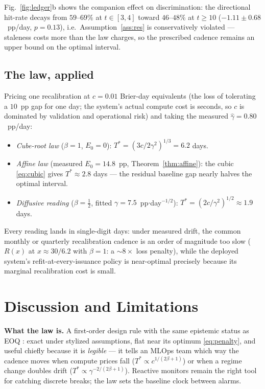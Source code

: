 \documentclass[conference]{IEEEtran}
\begin{document}
Fig.~\ref{fig:ledger}b shows the companion effect on discrimination: the
directional hit-rate decays from $59$--$69\%$ at $t\in[3,4]$ toward
$46$--$48\%$ at $t\ge10$ ($-1.11\pm0.68$~pp/day, $p{=}0.13$), i.e.\
Assumption~\ref{ass:res} is conservatively violated --- staleness costs more
than the law charges, so the prescribed cadence remains an upper bound on
the optimal interval.

\subsection{The law, applied}

Pricing one recalibration at $c=0.01$ Brier-day equivalents (the loss of
tolerating a $10$~pp gap for one day; the system's actual compute cost is
seconds, so $c$ is dominated by validation and operational risk) and taking
the measured $\hat\gamma=0.80$~pp/day:
\begin{itemize}
\item \emph{Cube-root law} ($\beta{=}1$, $E_0{=}0$):
$T^{*}=(3c/2\gamma^2)^{1/3}=6.2$ days.
\item \emph{Affine law} (measured $E_0=14.8$~pp, Theorem~\ref{thm:affine}):
the cubic \eqref{eq:cubic} gives $T^{*}\approx2.8$ days --- the residual
baseline gap nearly halves the optimal interval.
\item \emph{Diffusive reading} ($\beta{=}\tfrac12$, fitted
$\gamma=7.5$~pp$\cdot$day$^{-1/2}$): $T^{*}=(2c/\gamma^2)^{1/2}\approx1.9$
days.
\end{itemize}
Every reading lands in single-digit days: under measured drift, the common
monthly or quarterly recalibration cadence is an order of magnitude too slow
($R(x)$ at $x\approx30/6.2$ with $\beta{=}1$: a $\sim8\times$ loss
penalty), while the deployed system's refit-at-every-issuance policy is
near-optimal precisely because its marginal recalibration cost is small.

\section{Discussion and Limitations}
\label{sec:discussion}

\textbf{What the law is.} A first-order design rule with the same epistemic
status as EOQ \cite{harris1913}: exact under stylized assumptions, flat near
its optimum \eqref{eq:penalty}, and useful chiefly because it is
\emph{legible} --- it tells an MLOps team which way the cadence moves when
compute prices fall ($T^{*}\!\propto c^{1/(2\beta+1)}$) or when a regime
change doubles drift ($T^{*}\!\propto\gamma^{-2/(2\beta+1)}$). Reactive
monitors \cite{mahadevan2024cara,learningdebt2026,anytimevalid2026} remain
the right tool for catching discrete breaks; the law sets the baseline clock
between alarms.
\end{document}
